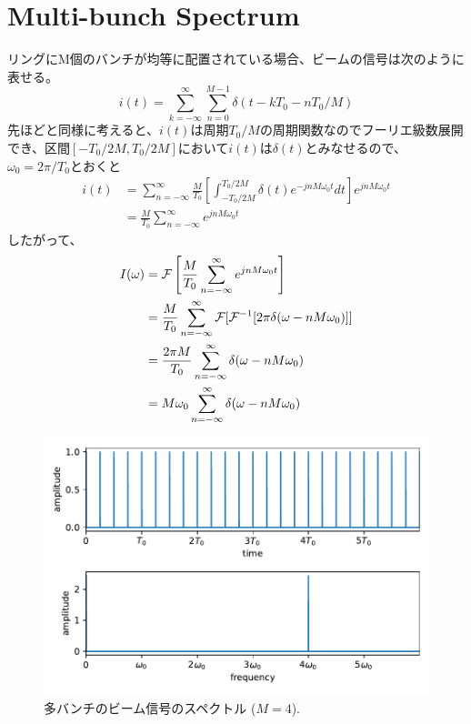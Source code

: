 \documentclass[]{jlreq}
\theoremstyle{definition}
\begin{document}
\section{Multi-bunch Spectrum}
リングにM個のバンチが均等に配置されている場合、ビームの信号は次のように表せる。
%
\begin{equation}
  i(t) = \sum_{k=-\infty}^{\infty} \sum_{n=0}^{M-1}\delta (t - k T_0 -n T_0 / M)
\end{equation}
%
先ほどと同様に考えると、$i(t)$は周期$T_0/M$の周期関数なのでフーリエ級数展開でき、区間$[-T_0/2M, T_0/2M]$において$i(t)$は$\delta(t)$とみなせるので、$\omega_0 = 2\pi/T_0$とおくと
%
\begin{align}
  i(t) &= \sum_{n = -\infty}^{\infty} \frac{M}{T_0} \left[\int_{-T_0/2M}^{T_0/2M}\delta (t) e^{-j n M \omega_0 t} dt\right] 
  e^{j n M \omega_0 t} \\
              &= \frac{M}{T_0} \sum_{n = -\infty}^{\infty} e^{j n M \omega_0 t} 
\end{align}
%
したがって、
%
\begin{align}
  I(\omega)  &= \mathcal{F}\left[\frac{M}{T_0} \sum_{n = -\infty}^{\infty} e^{j n M \omega_0 t}\right]\notag \\ 
      & = \frac{M}{T_0} \sum_{n = -\infty}^{\infty} \mathcal{F}[\mathcal{F}^{-1}[2\pi \delta(\omega - n M \omega_0)]]\notag \\ 
      & = \frac{2 \pi M}{T_0} \sum_{n = -\infty}^{\infty} \delta(\omega - n M \omega_0)\notag\\ 
      &= M \omega_0 \sum_{n = -\infty}^{\infty} \delta(\omega - n M \omega_0)
\end{align}
%
\begin{figure}[hbt]
  \begin{center}
    \includegraphics[width=12cm,clip]{multi_bunch.pdf}
    \caption{多バンチのビーム信号のスペクトル ($M=4$).}
   \label{multi_bunch}
  \end{center}
\end{figure}
%
\end{document}
